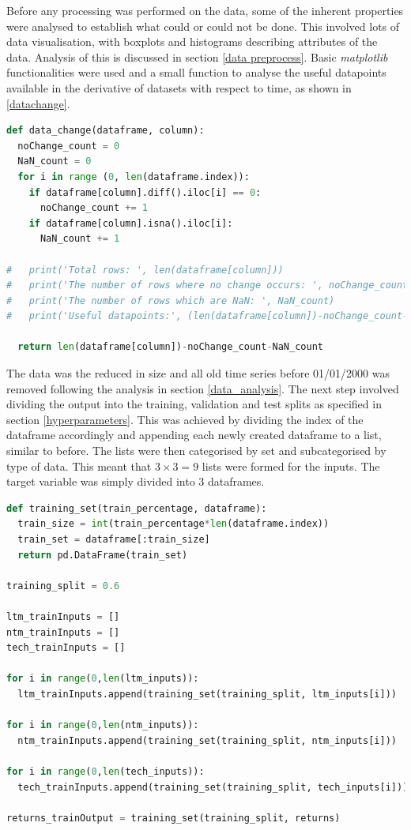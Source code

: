 \documentclass[10pt,onecolumn,letterpaper]{article}
\begin{document}
Before any processing was performed on the data, some of the inherent properties were analysed to establish what could or could not be done. This involved lots of data visualisation, with boxplots and histograms describing attributes of the data. Analysis of this is discussed in section \ref{data preprocess}. Basic \textit{matplotlib} functionalities were used and a small function to analyse the useful datapoints available in the derivative of datasets with respect to time, as shown in \ref{datachange}. 

\begin{lstlisting}[language=Python, breaklines=true, label={datachange}, caption={Identifying the available datapoint counts in differences of $x_{t}$ and $x_{t-1}$.}]
def data_change(dataframe, column): 
  noChange_count = 0
  NaN_count = 0
  for i in range (0, len(dataframe.index)): 
    if dataframe[column].diff().iloc[i] == 0:
      noChange_count += 1
    if dataframe[column].isna().iloc[i]: 
      NaN_count += 1
  
#   print('Total rows: ', len(dataframe[column]))
#   print('The number of rows where no change occurs: ', noChange_count)
#   print('The number of rows which are NaN: ', NaN_count)
#   print('Useful datapoints:', (len(dataframe[column])-noChange_count-NaN_count))

  return len(dataframe[column])-noChange_count-NaN_count
\end{lstlisting} 


The data was the reduced in size and all old time series before 01/01/2000 was removed following the analysis in section \ref{data_analysis}. The next step involved dividing the output into the training, validation and test splits as specified in section \ref{hyperparameters}. This was achieved by dividing the index of the dataframe accordingly and appending each newly created dataframe to a list, similar to before. The lists were then categorised by set and subcategorised by type of data. This meant that $3\times3=9$ lists were formed for the inputs. The target variable was simply divided into 3 dataframes. 

\begin{lstlisting}[language=Python, breaklines=true, caption= {Functionality to split original entire dataset into allocated training split size.}]
def training_set(train_percentage, dataframe): 
  train_size = int(train_percentage*len(dataframe.index)) 
  train_set = dataframe[:train_size]
  return pd.DataFrame(train_set)  

training_split = 0.6

ltm_trainInputs = []
ntm_trainInputs = []
tech_trainInputs = []

for i in range(0,len(ltm_inputs)):
  ltm_trainInputs.append(training_set(training_split, ltm_inputs[i]))
  
for i in range(0,len(ntm_inputs)):
  ntm_trainInputs.append(training_set(training_split, ntm_inputs[i]))

for i in range(0,len(tech_inputs)):
  tech_trainInputs.append(training_set(training_split, tech_inputs[i]))

returns_trainOutput = training_set(training_split, returns)
\end{lstlisting} 
\end{document}
